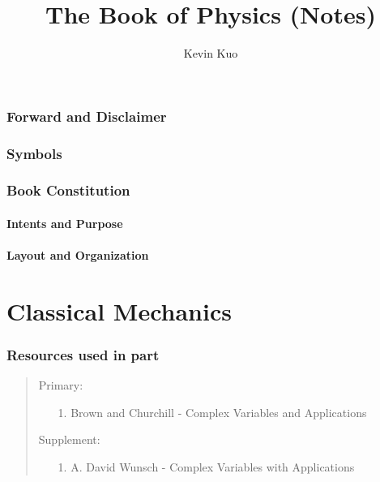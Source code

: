 \documentclass[12pt, english]{book}
\newenvironment{partintro}
{\vspace*{\fill}
	\section*{\centering Resources used in part \thepart}
	\begin{quotation}}
	{\end{quotation}\vspace*{\fill}\newpage}
\begin{document}
	\title{The Book of Physics (Notes)}
	\author{Kevin Kuo}
	
	\pagestyle{fancy}
	\fancyhead{} %
	\fancyhead[LO]{  }
	\fancyhead[CO]{  }
	\fancyhead[RO]{  }
	\renewcommand{\headrulewidth}{0pt}
	
	\fancyfoot{} %
	\fancyfoot[LO]{}
	\fancyfoot[CO]{\thepage}
	\fancyfoot[RO]{}
	\renewcommand{\footrulewidth}{0pt}
	\vspace{0cm}	
	
	\frontmatter
	
	\maketitle
	
	\newpage
	\section*{Forward and Disclaimer}
	
	
	\section*{Symbols}
	

	\newpage
	\section*{Book Constitution}
	\subsection*{Intents and Purpose}
	
	
	\subsection*{Layout and Organization}
	

	
	\section*{}
	\tableofcontents
	
	\mainmatter
	
	\part{Classical Mechanics} \label{Classical Mechanics Part}
	\begin{partintro}
		\noindent Primary:
		\begin{itemize}
			\item[1.] Brown and Churchill - Complex Variables and Applications
		\end{itemize}
		Supplement: 
		\begin{itemize}
			\item[1.] A. David Wunsch - Complex Variables with Applications
		\end{itemize}
	\end{partintro}
\end{document}

